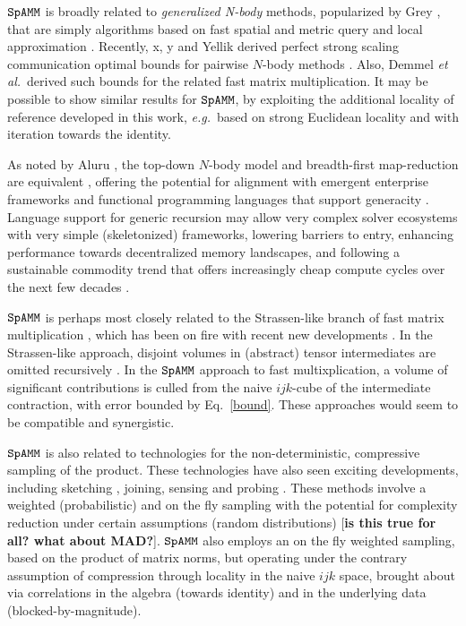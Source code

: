 \documentclass[letterpaper,twocolumn,amsmath,amsfont,amssymb,english,aps,jcp,preprintnumbers,groupaddress,nofootinbib,tightenlines]{revtex4}
\begin{document}
$\tt SpAMM$ is broadly related to {\em generalized N-body} methods,
popularized by Grey \cite{}, that are simply algorithms based on fast
spatial and metric query \cite{Sammet} and local approximation
\cite{}.  Recently, x, y and Yellik derived perfect strong scaling
communication optimal bounds for pairwise $N$-body methods
\cite{Warren Salmon, Yellik}.  Also, Demmel \emph{et al.}~derived such
bounds for the related fast matrix multiplication.  It may be possible
to show similar results for $\tt SpAMM$, by exploiting the additional
locality of reference developed in this work, {\em e.g.}~based on
strong Euclidean locality and with iteration towards the identity.

As noted by Aluru \cite{}, the top-down $N$-body model and
breadth-first map-reduction are equivalent \cite{}, offering the
potential for alignment with emergent enterprise frameworks \cite{}
and functional programming languages that support generacity
\cite{}. Language support for generic recursion may allow very complex
solver ecosystems with very simple (skeletonized) frameworks, lowering
barriers to entry, enhancing performance towards decentralized memory
landscapes, and following a sustainable commodity trend
\cite{softwaresustainanbilty} that offers increasingly cheap compute
cycles over the next few decades \cite{}.

$\tt SpAMM$ is perhaps most closely related to the Strassen-like
branch of fast matrix multiplication \cite{}, which has been on fire
with recent new developments \cite{}.  In the Strassen-like approach,
disjoint volumes in (abstract) tensor intermediates are omitted
recursively \cite{}.  In the $\tt SpAMM$ approach to fast
multixplication, a volume of significant contributions is culled from
the naive $ijk$-cube of the intermediate contraction, with error
bounded by Eq.~\ref{bound}.  These approaches would seem to be
compatible and synergistic.

$\tt SpAMM$ is also related to technologies for the non-deterministic,
compressive sampling of the product.  These technologies have also
seen exciting developments, including sketching \cite{Kutzkov2012,
  Pagh2013}, joining, sensing and probing \cite{}.  These methods
involve a weighted (probabilistic) and on the fly sampling with the
potential for complexity reduction under certain assumptions (random
distributions) [{\bf is this true for all? what about MAD?}].  $\tt
SpAMM$ also employs an on the fly weighted sampling, based on the
product of matrix norms, but operating under the contrary assumption
of compression through locality in the naive $ijk$ space, brought
about via correlations in the algebra (towards identity) and in the
underlying data (blocked-by-magnitude).
\end{document}
